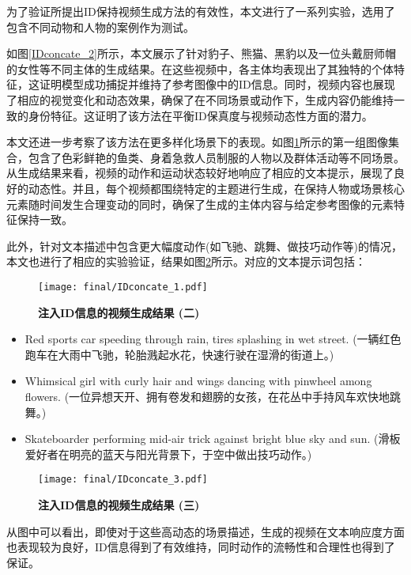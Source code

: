 为了验证所提出ID保持视频生成方法的有效性，本文进行了一系列实验，选用了包含不同动物和人物的案例作为测试。

如图\ref{IDconcate_2}所示，本文展示了针对豹子、熊猫、黑豹以及一位头戴厨师帽的女性等不同主体的生成结果。在这些视频中，各主体均表现出了其独特的个体特征，这证明模型成功捕捉并维持了参考图像中的ID信息。同时，视频内容也展现了相应的视觉变化和动态效果，确保了在不同场景或动作下，生成内容仍能维持一致的身份特征。这证明了该方法在平衡ID保真度与视频动态性方面的潜力。

本文还进一步考察了该方法在更多样化场景下的表现。如图\ref{IDconcate_1}所示的第一组图像集合，包含了色彩鲜艳的鱼类、身着急救人员制服的人物以及群体活动等不同场景。从生成结果来看，视频的动作和运动状态较好地响应了相应的文本提示，展现了良好的动态性。并且，每个视频都围绕特定的主题进行生成，在保持人物或场景核心元素随时间发生合理变动的同时，确保了生成的主体内容与给定参考图像的元素特征保持一致。

此外，针对文本描述中包含更大幅度动作(如飞驰、跳舞、做技巧动作等)的情况，本文也进行了相应的实验验证，结果如图\ref{IDconcate_3}所示。对应的文本提示词包括：

\begin{figure}[htbp]
    \centering
    \texttt{[image: final/IDconcate\_1.pdf]}
    \caption{\textbf{注入ID信息的视频生成结果 (二)}}
    \label{IDconcate_1}
\end{figure}

\begin{itemize}
\item Red sports car speeding through rain, tires splashing in wet street. (一辆红色跑车在大雨中飞驰，轮胎溅起水花，快速行驶在湿滑的街道上。)
\item Whimsical girl with curly hair and wings dancing with pinwheel among flowers. (一位异想天开、拥有卷发和翅膀的女孩，在花丛中手持风车欢快地跳舞。)
\item Skateboarder performing mid-air trick against bright blue sky and sun. (滑板爱好者在明亮的蓝天与阳光背景下，于空中做出技巧动作。)
\end{itemize}

\begin{figure}[htbp]
    \centering
    \texttt{[image: final/IDconcate\_3.pdf]}
    \caption{\textbf{注入ID信息的视频生成结果 (三)}}
    \label{IDconcate_3}
\end{figure}
从图中可以看出，即使对于这些高动态的场景描述，生成的视频在文本响应度方面也表现较为良好，ID信息得到了有效维持，同时动作的流畅性和合理性也得到了保证。

